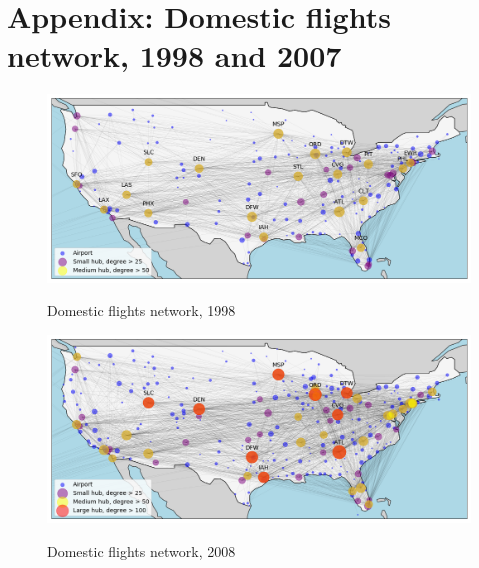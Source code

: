 \section{Appendix: Domestic flights network, 1998 and 2007}
\label{app:map_general}
\begin{figure}[H]
  \centering
  \caption{Domestic flights network, 1998}
    \includegraphics[width=1. \textwidth]{Exam/Figures/map_general_98}
    \vspace{-0.7cm}
  \label{fig:map_general_98}
\end{figure}

\begin{figure}[H]
  \centering
  \caption{Domestic flights network, 2008}
    \includegraphics[width=1. \textwidth]{Exam/Figures/map_general_08}
    \vspace{-0.7cm}
  \label{fig:map_general_07}
\end{figure}
